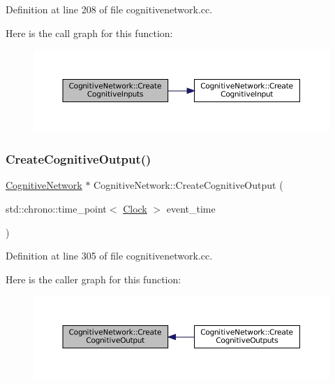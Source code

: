 Definition at line 208 of file cognitivenetwork.\+cc.

Here is the call graph for this function\+:\nopagebreak
\begin{figure}[H]
\begin{center}
\leavevmode
\includegraphics[width=350pt]{class_cognitive_network_a0833f7b587f14e0c0778661a56bce957_cgraph}
\end{center}
\end{figure}
\mbox{\label{class_cognitive_network_ac220350499bd323bd8f24ff0050cd60d}} 
\subsubsection{\texorpdfstring{Create\+Cognitive\+Output()}{CreateCognitiveOutput()}}
{\footnotesize\ttfamily \mbox{\hyperlink{class_cognitive_network}{Cognitive\+Network}} $\ast$ Cognitive\+Network\+::\+Create\+Cognitive\+Output (\begin{DoxyParamCaption}\item[{std\+::chrono\+::time\+\_\+point$<$ \mbox{\hyperlink{universe_8h_a0ef8d951d1ca5ab3cfaf7ab4c7a6fd80}{Clock}} $>$}]{event\+\_\+time }\end{DoxyParamCaption})}



Definition at line 305 of file cognitivenetwork.\+cc.

Here is the caller graph for this function\+:\nopagebreak
\begin{figure}[H]
\begin{center}
\leavevmode
\includegraphics[width=350pt]{class_cognitive_network_ac220350499bd323bd8f24ff0050cd60d_icgraph}
\end{center}
\end{figure}
\mbox{\label{class_cognitive_network_a002df11f4389a122fc140c186ab665c9}} 
